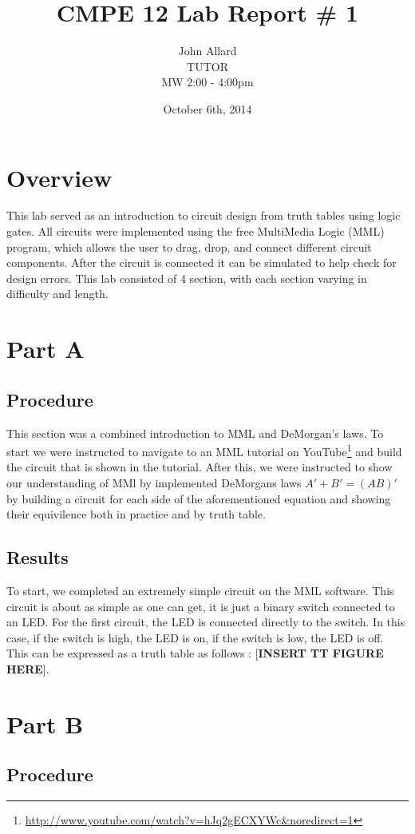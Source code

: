 \documentclass[a4paper,11pt]{article}
\title{ CMPE 12 Lab Report \# 1}
\author{John Allard \\ TUTOR \\ MW 2:00 - 4:00pm}
\date{October 6th, 2014}
\begin{document}
\maketitle

\section{Overview}
This lab served as an introduction to circuit design from truth tables using logic gates. All circuits were implemented using the free MultiMedia Logic (MML) program, which allows the user to drag, drop, and connect different circuit components. After the circuit is connected it can be simulated to help check for design errors. This lab consisted of 4 section, with each section varying in difficulty and length. 

\section{Part A}
\subsection{Procedure}
This section was a combined introduction to MML and DeMorgan's laws. To start we were instructed to navigate to an MML tutorial on YouTube\footnote{\url{http://www.youtube.com/watch?v=hJq2gECXYWc&noredirect=1}} and build the circuit that is shown in the tutorial. After this, we were instructed to show our understanding of MMl by implemented DeMorgans laws \(A'+B' = (AB)'\) by building a circuit for each side of the aforementioned equation and showing their equivilence both in practice and by truth table. 
\subsection{Results}
To start, we completed an extremely simple circuit on the MML software. This circuit is about as simple as one can get, it is just a binary switch connected to an LED. For the first circuit, the LED is connected directly to the switch. In this case, if the switch is high, the LED is on, if the switch is low, the LED is off. This can be expressed as a truth table as follows : [\textbf{INSERT TT FIGURE HERE}].

\section{Part B}
\subsection{Procedure}
\end{document}
